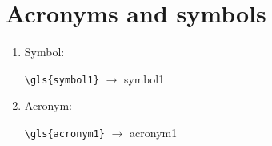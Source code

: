 \section{Acronyms and symbols}\label{sec:Elements_acrosyms}
\begin{enumerate}
  \item Symbol:
  
  \verb=\gls{symbol1}= $\rightarrow$ \gls{symbol1}

  \item Acronym:

  \verb=\gls{acronym1}= $\rightarrow$ \gls{acronym1}
\end{enumerate}